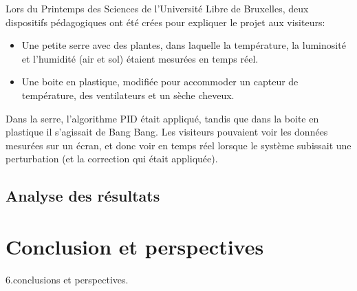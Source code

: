 \documentclass[a4paper,10pt]{report}
\begin{document}
Lors du Printemps des Sciences de l'Université Libre de Bruxelles, deux dispositifs pédagogiques ont été crées pour expliquer le projet aux visiteurs:

\begin{itemize}
\item Une petite serre avec des plantes, dans laquelle la température, la luminosité et l'humidité (air et sol) étaient mesurées en temps réel.
\item Une boite en plastique, modifiée pour accommoder un capteur de température, des ventilateurs et un sèche cheveux.
\end{itemize}

Dans la serre, l'algorithme PID était appliqué, tandis que dans la boite en plastique il s'agissait de Bang Bang. Les visiteurs pouvaient voir les données mesurées sur un écran, et donc voir en temps réel lorsque le système subissait une perturbation (et la correction qui était appliquée).

\section{Analyse des résultats}

\chapter{Conclusion et perspectives}
6.conclusions et perspectives.




\end{document}
